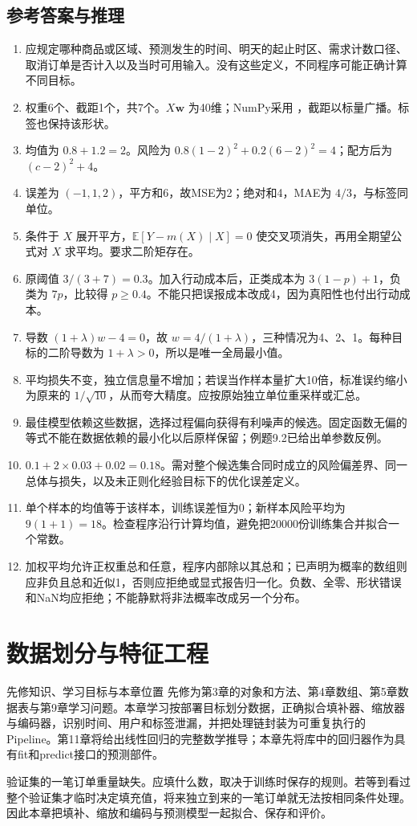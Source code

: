 \documentclass[UTF8,fontset=none,zihao=-4,a4paper]{ctexart}
\newcommand{\chapterpage}[1]{\clearpage\section{#1}}
\newcommand{\code}[1]{\texttt{\detokenize{#1}}}
\numberwithin{equation}{section}
\numberwithin{figure}{section}
\begin{document}
\subsection{参考答案与推理}
\begin{enumerate}[label=9.\arabic*,before={\interlinepenalty=10000}]
\item 应规定哪种商品或区域、预测发生的时间、明天的起止时区、需求计数口径、取消订单是否计入以及当时可用输入。没有这些定义，不同程序可能正确计算不同目标。
\item 权重6个、截距1个，共7个。$X\symbf w$ 为40维；NumPy采用 \code{(40,)}，截距以标量广播。标签也保持该形状。
\item 均值为 $0.8+1.2=2$。风险为 $0.8(1-2)^2+0.2(6-2)^2=4$；配方后为 $(c-2)^2+4$。
\item 误差为 $(-1,1,2)$，平方和6，故MSE为2；绝对和4，MAE为 $4/3$，与标签同单位。
\item 条件于 $X$ 展开平方，$\mathbb E[Y-m(X)\mid X]=0$ 使交叉项消失，再用全期望公式对 $X$ 求平均。要求二阶矩存在。
\item 原阈值 $3/(3+7)=0.3$。加入行动成本后，正类成本为 $3(1-p)+1$，负类为 $7p$，比较得 $p\geq0.4$。不能只把误报成本改成4，因为真阳性也付出行动成本。
\item 导数 $(1+\lambda)w-4=0$，故 $w=4/(1+\lambda)$，三种情况为4、2、1。每种目标的二阶导数为 $1+\lambda>0$，所以是唯一全局最小值。
\item 平均损失不变，独立信息量不增加；若误当作样本量扩大10倍，标准误约缩小为原来的 $1/\sqrt{10}$，从而夸大精度。应按原始独立单位重采样或汇总。
\item 最佳模型依赖这些数据，选择过程偏向获得有利噪声的候选。固定函数无偏的等式不能在数据依赖的最小化以后原样保留；例题9.2已给出单参数反例。
\item $0.1+2\times0.03+0.02=0.18$。需对整个候选集合同时成立的风险偏差界、同一总体与损失，以及未正则化经验目标下的优化误差定义。
\item 单个样本的均值等于该样本，训练误差恒为0；新样本风险平均为 $9(1+1)=18$。检查程序沿行计算均值，避免把20000份训练集合并拟合一个常数。
\item 加权平均允许正权重总和任意，程序内部除以其总和；已声明为概率的数组则应非负且总和近似1，否则应拒绝或显式报告归一化。负数、全零、形状错误和NaN均应拒绝；不能静默将非法概率改成另一个分布。
\end{enumerate}

\chapterpage{数据划分与特征工程}\label{ch:features}
\begin{infobox}{先修知识、学习目标与本章位置}
先修为第3章的对象和方法、第4章数组、第5章数据表与第9章学习问题。本章学习按部署目标划分数据，正确拟合填补器、缩放器与编码器，识别时间、用户和标签泄漏，并把处理链封装为可重复执行的Pipeline。第11章将给出线性回归的完整数学推导；本章先将库中的回归器作为具有fit和predict接口的预测部件。
\end{infobox}
验证集的一笔订单重量缺失。应填什么数，取决于训练时保存的规则。若等到看过整个验证集才临时决定填充值，将来独立到来的一笔订单就无法按相同条件处理。因此本章把填补、缩放和编码与预测模型一起拟合、保存和评价。
\end{document}
